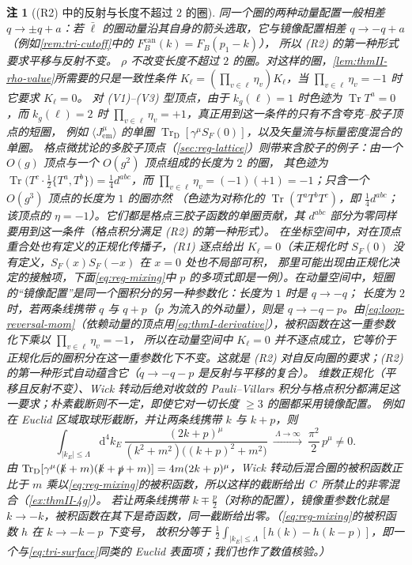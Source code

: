 \documentclass[UTF8,a4paper,11pt,fontset=fandol]{ctexart}
\theoremstyle{cplain}
\theoremstyle{cdefinition}
\theoremstyle{cremark}
\newtheorem{remark}[theorem]{注}
\numberwithin{equation}{section}
\DeclareMathOperator{\Tr}{Tr}
\newcommand{\TrD}{\operatorname{Tr}_{\mathrm{D}}}   %
\newcommand{\sla}[1]{\slashed{#1}}                  %
\newcommand{\dd}{\mathrm{d}}                         %
\newcommand{\SF}{S_{F}}                              %
\begin{document}
\begin{remark}[(R2) 中的反射与长度不超过 $2$ 的圈]\label{rem:reg-selfreverse}
同一个圈的两种动量配置一般相差 $q\to\pm q+a$：若 $\bar\ell$ 的圈动量沿其自身的箭头选取，它与镜像配置相差 $q\to-q+a$（例如\cref{rem:tri-cutoff}中的 $F_B^{\mathrm{can}}(k)=F_B(p_1-k)$），
所以 (R2) 的第一种形式要求平移\emph{与}反射不变。
$\rho$ 不改变长度不超过 $2$ 的圈。对这样的圈，\cref{lem:thmII-rho-value}所需要的只是一致性条件 $K_\ell=(\prod_{v\in\ell}\eta_v)K_\ell$，当 $\prod_{v\in\ell}\eta_v=-1$ 时它要求 $K_\ell=0$。
对 (V1)--(V3) 型顶点，由于 $k_g(\ell)=1$ 时色迹为 $\Tr T^a=0$，而 $k_g(\ell)=2$ 时 $\prod_{v\in\ell}\eta_v=+1$，真正用到这一条件的只有不含夸克--胶子顶点的短圈，
例如 $\langle J^\mu_{\mathrm{em}}\rangle$ 的单圈 $\TrD[\gamma^\mu\SF(0)]$，以及矢量流与标量密度混合的单圈。
格点微扰论的多胶子顶点（\cref{sec:reg-lattice}）则带来含胶子的例子：由一个 $O(g)$ 顶点与一个 $O(g^2)$ 顶点组成的长度为 $2$ 的圈，
其色迹为 $\Tr\bigl(T^c\cdot\tfrac12\{T^a,T^b\}\bigr)=\tfrac14d^{abc}$，而 $\prod_{v\in\ell}\eta_v=(-1)(+1)=-1$；只含一个 $O(g^3)$ 顶点的长度为 $1$ 的圈亦然
（色迹为对称化的 $\Tr(T^aT^bT^c)$，即 $\tfrac14d^{abc}$；该顶点的 $\eta=-1$）。它们都是格点三胶子函数的单圈贡献，其 $d^{abc}$ 部分为零同样要用到这一条件（格点积分满足 (R2) 的第一种形式）。
在坐标空间中，对在顶点重合处也有定义的正规化传播子，(R1) 逐点给出 $K_\ell=0$（未正规化时 $\SF(0)$ 没有定义，$\SF(x)\SF(-x)$ 在 $x=0$ 处也不局部可积，
那里可能出现由正规化决定的接触项，下面\cref{eq:reg-mixing}中 $p$ 的多项式即是一例）。在动量空间中，短圈的“镜像配置”是同一个圈积分的另一种参数化：长度为 $1$ 时是 $q\to-q$；
长度为 $2$ 时，若两条线携带 $q$ 与 $q+p$（$p$ 为流入的外动量），则是 $q\to-q-p$。由\cref{eq:loop-reversal-mom}（依赖动量的顶点用\cref{eq:thmI-derivative}），被积函数在这一重参数化下乘以 $\prod_{v\in\ell}\eta_v=-1$，
所以在动量空间中 $K_\ell=0$ 并不逐点成立，它等价于正规化后的圈积分在这一重参数化下不变。这就是 (R2) 对自反向圈的要求；(R2) 的第一种形式自动蕴含它（$q\to-q-p$ 是反射与平移的复合）。
维数正规化（平移且反射不变）、Wick 转动后绝对收敛的 Pauli--Villars 积分与格点积分都满足这一要求；朴素截断则不一定，即使它对一切长度 $\ge3$ 的圈都采用镜像配置。
例如在 Euclid 区域取球形截断，并让两条线携带 $k$ 与 $k+p$，则
\begin{equation}\label{eq:reg-mixing}
\int_{|k_E|\le\Lambda}\dd^4k_E\,\frac{(2k+p)^\mu}{(k^2+m^2)\bigl((k+p)^2+m^2\bigr)}\ \xrightarrow{\ \Lambda\to\infty\ }\ \frac{\pi^2}{2}\,p^\mu\neq0 .
\end{equation}
由 $\TrD[\gamma^\mu(\sla k+m)(\sla k+\sla p+m)]=4m(2k+p)^\mu$，Wick 转动后混合圈的被积函数正比于 $m$ 乘以\cref{eq:reg-mixing}的被积函数，所以这样的截断给出 C~所禁止的非零混合（\cref{ex:thmII-4g}）。
若让两条线携带 $k\mp\frac p2$（对称的配置），镜像重参数化就是 $k\to-k$，被积函数在其下是奇函数，同一截断给出零。（\cref{eq:reg-mixing}的被积函数 $h$ 在 $k\to-k-p$ 下变号，
故积分等于 $\frac12\int_{|k_E|\le\Lambda}[h(k)-h(k-p)]$，即一个与\cref{eq:tri-surface}同类的 Euclid 表面项；我们也作了数值核验。）
\end{remark}
\end{document}

